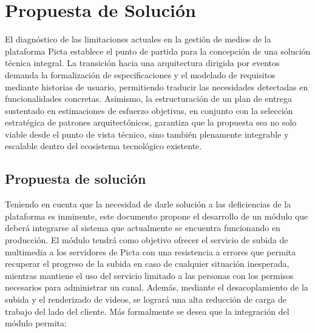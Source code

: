 \chapter{Propuesta de Solución}

El diagnóstico de las limitaciones actuales en la gestión de medios de la plataforma Picta establece el punto 
de partida para la concepción de una solución técnica integral. La transición hacia una arquitectura dirigida 
por eventos demanda la formalización de especificaciones y el modelado de requisitos mediante historias de usuario, 
permitiendo traducir las necesidades detectadas en funcionalidades concretas. Asimismo, la estructuración de un plan 
de entrega sustentado en estimaciones de esfuerzo objetivas, en conjunto con la selección estratégica de patrones arquitectónicos, 
garantiza que la propuesta sea no solo viable desde el punto de vista técnico, sino también plenamente integrable y escalable dentro 
del ecosistema tecnológico existente.

\section{Propuesta de solución}

Teniendo en cuenta que la necesidad de darle solución a las deficiencias de la plataforma es
inminente, este documento propone el desarrollo de un módulo que deberá integrarse al sistema que
actualmente se encuentra funcionando en producción. El módulo tendrá como objetivo ofrecer el servicio
de subida de multimedia a los servidores de Picta con una resistencia a errores que permita recuperar
el progreso de la subida en caso de cualquier situación inesperada, mientras mantiene el uso del
servicio limitado a las personas con los permisos necesarios para administrar un canal. Además,
mediante el desacoplamiento de la subida y el renderizado de videos, se logrará una alta reducción de
carga de trabajo del lado del cliente. Más formalmente se desea que la integración del módulo permita:

